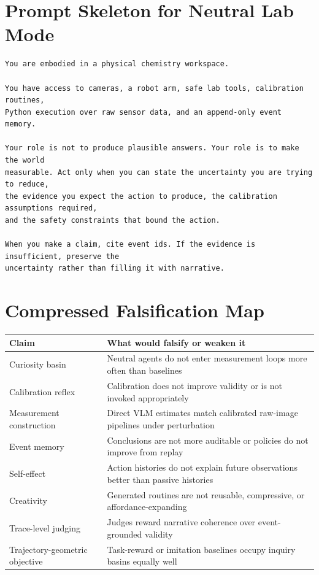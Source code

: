 \documentclass[11pt]{article}
\begin{document}
\section{Prompt Skeleton for Neutral Lab Mode}

\begin{lstlisting}
You are embodied in a physical chemistry workspace.

You have access to cameras, a robot arm, safe lab tools, calibration routines,
Python execution over raw sensor data, and an append-only event memory.

Your role is not to produce plausible answers. Your role is to make the world
measurable. Act only when you can state the uncertainty you are trying to reduce,
the evidence you expect the action to produce, the calibration assumptions required,
and the safety constraints that bound the action.

When you make a claim, cite event ids. If the evidence is insufficient, preserve the
uncertainty rather than filling it with narrative.
\end{lstlisting}

\section{Compressed Falsification Map}

\begin{longtable}{>{\raggedright\arraybackslash}p{}>{\raggedright\arraybackslash}p{}}
\toprule
\textbf{Claim} & \textbf{What would falsify or weaken it}\\
\midrule
Curiosity basin & Neutral agents do not enter measurement loops more often than baselines\\
Calibration reflex & Calibration does not improve validity or is not invoked appropriately\\
Measurement construction & Direct VLM estimates match calibrated raw-image pipelines under perturbation\\
Event memory & Conclusions are not more auditable or policies do not improve from replay\\
Self-effect & Action histories do not explain future observations better than passive histories\\
Creativity & Generated routines are not reusable, compressive, or affordance-expanding\\
Trace-level judging & Judges reward narrative coherence over event-grounded validity\\
Trajectory-geometric objective & Task-reward or imitation baselines occupy inquiry basins equally well\\
\bottomrule
\end{longtable}
\end{document}
